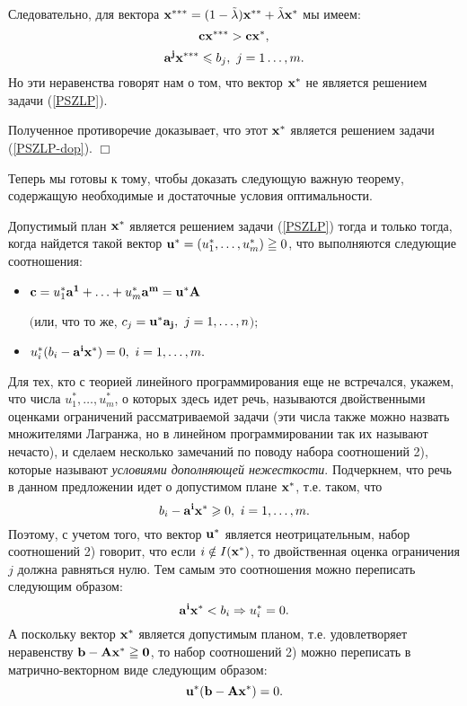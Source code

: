     Следовательно, для вектора
    $\mathbf{x^{***}}=(1-\tilde{\lambda})\mathbf{x^{**}}+\tilde{\lambda}\mathbf{x^{*}}$
    мы имеем:
\[
    \mathbf{c}\mathbf{x^{***}}>\mathbf{c}\mathbf{x^{*}},
\]
\[
    \vc{a^{j}}\vc{x^{***}}\leqslant b_j, \ j=1\ldots,m.
\]
    Но эти неравенства говорят нам о том, что вектор $\mathbf{x^{*}}$ не
    является решением задачи (\ref{PSZLP}).

    Полученное противоречие
    доказывает, что этот $\mathbf{x^{*}}$ является решением задачи
    (\ref{PSZLP-dop}). $\Box$

   Теперь мы готовы к тому, чтобы доказать следующую важную теорему,
   содержащую необходимые и достаточные условия оптимальности.


\begin{teo}
    \label{PSZLPV-usl-opt}
    Допустимый план $\mathbf{x}^{*}$ является решением задачи
    (\ref{PSZLP}) тогда и только тогда, когда найдется такой вектор
    $\mathbf{u}^{*}=(u_{1}^{*},\ldots,u_{m}^{*})\geqq0$, что выполняются
    следующие соотношения:
\begin{itemize}
    \item [1)\ ]
    $\mathbf{c}=u_{1}^{*}\mathbf{a^{1}}+\ldots+u_{m}^{*}\mathbf{a^{m}}=\mathbf{u}^{*}\mathbf{A}$

    $($или, что то же,
    $c_{j}=\vc{u^{*}}\vc{a_{j}}, \ j=1,\ldots,n$$);$
    \item [2)\ ]
    $u_{i}^{*}(b_{i}-\vc{a^{i}}\vc{x}^{*})=0, \ i=1,\ldots,m.$
\end{itemize}
\end{teo}

    Для тех, кто с теорией линейного программирования еще не
    встречался, укажем, что
    числа $u_{1}^{*},\ldots,u_{m}^{*}$, о которых здесь идет речь, называются
    двойственными оценками ограничений рассматриваемой задачи (эти
    числа также можно назвать множителями Лагранжа, но в линейном
    программировании так их называют нечасто), и
    сделаем несколько замечаний по поводу набора соотношений 2), которые
    называют \emph{условиями дополняющей нежесткости}. Подчеркнем, что речь в
    данном предложении идет о допустимом плане $\mathbf{x}^{*}$,
    т.е. таком, что
    \[b_{i}-\vc{a^{i}}\vc{x}^{*}\geqslant0, \ i=1,\ldots,m.\]
    Поэтому, с учетом того, что вектор $\mathbf{u}^{*}$ является неотрицательным,
    набор соотношений 2) говорит, что если $i\notin I(\mathbf{x}^{*})$, то
    двойственная оценка ограничения $j$ должна равняться нулю. Тем самым
    это соотношения можно переписать следующим образом:
    \[\mathbf{a^{i}}\mathbf{x}^{*}<b_{i}\Rightarrow  u_{i}^{*}=0.\]
    А поскольку вектор $\mathbf{x}^{*}$ является допустимым планом, т.е.
    удовлетворяет неравенству $\mathbf{b}-\mathbf{A}\mathbf{x}^{*}\geqq\mathbf{0}$,
    то набор соотношений 2) можно переписать в матрично-векторном виде следующим образом:
    \[\mathbf{u}^{*}(\mathbf{b}-\mathbf{A}\mathbf{x}^{*})=0.\]






